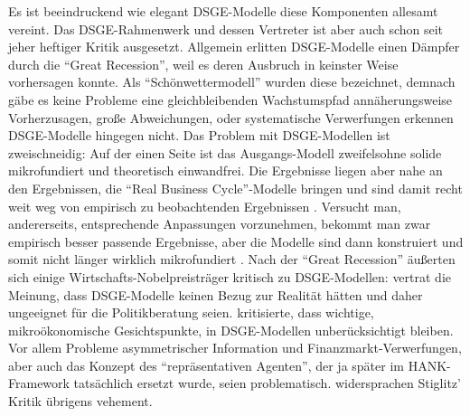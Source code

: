 Es ist beeindruckend wie elegant DSGE-Modelle diese Komponenten allesamt vereint. Das DSGE-Rahmenwerk und dessen Vertreter ist aber auch schon seit jeher heftiger Kritik ausgesetzt. Allgemein erlitten DSGE-Modelle einen Dämpfer durch die "`Great Recession"', weil es deren Ausbruch in keinster Weise vorhersagen konnte. Als "`Schönwettermodell"' wurden diese bezeichnet, demnach gäbe es keine Probleme eine gleichbleibenden Wachstumspfad annäherungsweise Vorherzusagen, große Abweichungen, oder systematische Verwerfungen erkennen DSGE-Modelle hingegen nicht. Das Problem mit DSGE-Modellen ist zweischneidig: Auf der einen Seite ist das Ausgangs-Modell \parencite{Gali2000} zweifelsohne solide mikrofundiert und theoretisch einwandfrei. Die Ergebnisse liegen aber nahe an den Ergebnissen, die "`Real Business Cycle"'-Modelle bringen und sind damit recht weit weg von empirisch zu beobachtenden Ergebnissen \parencite[S. 311]{Romer2019}. Versucht man, andererseits, entsprechende Anpassungen vorzunehmen, bekommt man zwar empirisch besser passende Ergebnisse, aber die Modelle sind dann konstruiert und somit nicht länger wirklich mikrofundiert \parencite[S. 364]{Romer2019}. 
Nach der "`Great Recession"' äußerten sich einige Wirtschafts-Nobelpreisträger kritisch zu DSGE-Modellen: \textcite{Solow2010} vertrat die Meinung, dass DSGE-Modelle keinen Bezug zur Realität hätten und daher ungeeignet für die Politikberatung seien. \textcite{Stiglitz2017} kritisierte, dass wichtige, mikroökonomische Gesichtspunkte, in  DSGE-Modellen unberücksichtigt bleiben. Vor allem Probleme asymmetrischer Information und Finanzmarkt-Verwerfungen, aber auch das Konzept des "`repräsentativen Agenten"', der ja später im HANK-Framework tatsächlich ersetzt wurde, seien problematisch. \textcite[S. 133]{Christiano2018} widersprachen Stiglitz' Kritik übrigens vehement.

